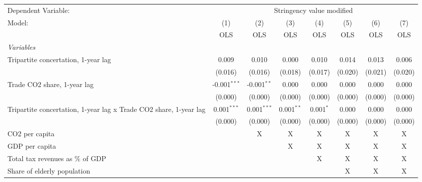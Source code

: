 
\begingroup
\centering
\begin{tabular}{lccccccc}
   \toprule
   Dependent Variable: & \multicolumn{7}{c}{Stringency value modified}\\
   Model:                                                            & (1)            & (2)           & (3)          & (4)         & (5)     & (6)     & (7)\\  
                                                                     &  OLS           & OLS           & OLS          & OLS         & OLS     & OLS     & OLS\\  
   \midrule
   \emph{Variables}\\
   Tripartite concertation, 1-year lag                               & 0.009          & 0.010         & 0.000        & 0.010       & 0.014   & 0.013   & 0.006\\   
                                                                     & (0.016)        & (0.016)       & (0.018)      & (0.017)     & (0.020) & (0.021) & (0.020)\\   
   Trade CO2 share, 1-year lag                                       & -0.001$^{***}$ & -0.001$^{**}$ & 0.000        & 0.000       & 0.000   & 0.000   & 0.000\\   
                                                                     & (0.000)        & (0.000)       & (0.000)      & (0.000)     & (0.000) & (0.000) & (0.000)\\   
   Tripartite concertation, 1-year lag x Trade CO2 share, 1-year lag & 0.001$^{***}$  & 0.001$^{***}$ & 0.001$^{**}$ & 0.001$^{*}$ & 0.000   & 0.000   & 0.000\\   
                                                                     & (0.000)        & (0.000)       & (0.000)      & (0.000)     & (0.000) & (0.000) & (0.000)\\   
   CO2 per capita                                                    &                & X             & X            & X           & X       & X       & X\\  
   GDP per capita                                                    &                &               & X            & X           & X       & X       & X\\  
   Total tax revenues as \% of GDP                                   &                &               &              & X           & X       & X       & X\\  
   Share of elderly population                                       &                &               &              &             & X       & X       & X\\  

\end{tabular}
